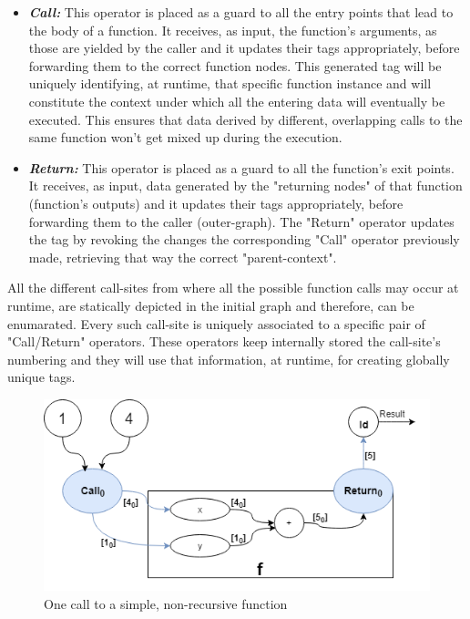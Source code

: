 \documentclass[ack,preface]{dithesis}
\begin{document}
    \begin{itemize}

    \item \textit{\textbf{Call:}} This operator is placed as a guard to all the entry points that lead to the body of a function. It receives, as input, the function's arguments, as those are yielded by the caller and it updates their tags appropriately, before forwarding them to the correct function nodes. This generated tag will be uniquely identifying, at runtime, that specific function instance and will constitute the context under which all the entering data will eventually be executed. This ensures that data derived by different, overlapping calls to the same function won't get mixed up during the execution.

    \item \textit{\textbf{Return:}} This operator is placed as a guard to all the function's exit points. It receives, as input, data generated by the "returning nodes" of that function (function's outputs) and it updates their tags appropriately, before forwarding them to the caller (outer-graph).  The "Return" operator updates the tag by revoking the changes the corresponding "Call" operator previously made, retrieving that way the correct "parent-context".

    \end{itemize}

All the different call-sites from where all the possible function calls may occur at runtime, are statically depicted in the initial graph and therefore, can be enumarated.
Every such call-site is uniquely associated to a specific pair of "Call/Return" operators. These operators keep internally stored the call-site's numbering and they will use that information, at runtime, for creating globally unique tags. 

\begin{figure}
\centering
\includegraphics[scale=0.65]{figures/Example1}
\caption{One call to a simple, non-recursive function}
\end{figure}
\end{document}
